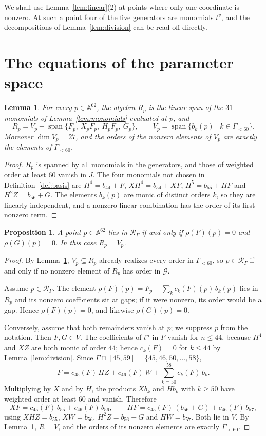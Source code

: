 \documentclass{amsart}
\newtheorem{proposition}[theorem]{Proposition}
\newtheorem{lemma}[theorem]{Lemma}
\theoremstyle{definition}
\theoremstyle{remark}
\numberwithin{equation}{section}
\newcommand{\AF}{\mathbb{A}}
\newcommand{\Rs}{\mathcal{R}_\Gamma}
\DeclareMathOperator{\spn}{span}
\begin{document}
We shall use Lemma~\ref{lem:linear}(2) at points where only one coordinate is nonzero. At such a point four of the five generators are monomials $t^{v}$, and the decompositions of Lemma~\ref{lem:division} can be read off directly.

\section{The equations of the parameter space}\label{sec:equations}

\begin{lemma}\label{lem:span}
For every $p\in\AF^{62}$, the algebra $R_p$ is the linear span of the $31$ monomials of Lemma~\ref{lem:monomials} evaluated at $p$, and
\[
R_p=V_p+\spn\{F_p,\ X_pF_p,\ H_pF_p,\ G_p\},\qquad V_p=\spn\{b_k(p)\mid k\in\Gamma_{<60}\}.
\]
Moreover $\dim V_p=27$, and the orders of the nonzero elements of $V_p$ are exactly the elements of $\Gamma_{<60}$.
\end{lemma}

\begin{proof}
$R_p$ is spanned by all monomials in the generators, and those of weighted order at least $60$ vanish in $J$. The four monomials not chosen in Definition~\ref{def:basis} are $H^4=b_{44}+F$, $XH^4=b_{54}+XF$, $H^5=b_{55}+HF$ and $H^2Z=b_{56}+G$. The elements $b_k(p)$ are monic of distinct orders $k$, so they are linearly independent, and a nonzero linear combination has the order of its first nonzero term.
\end{proof}

\begin{proposition}\label{prop:criterion}
A point $p\in\AF^{62}$ lies in $\Rs$ if and only if $\rho(F)(p)=0$ and $\rho(G)(p)=0$. In this case $R_p=V_p$.
\end{proposition}

\begin{proof}
By Lemma~\ref{lem:span}, $V_p\subseteq R_p$ already realizes every order in $\Gamma_{<60}$, so $p\in\Rs$ if and only if no nonzero element of $R_p$ has order in $\mathcal G$.

Assume $p\in\Rs$. The element $\rho(F)(p)=F_p-\sum_kc_k(F)(p)\,b_k(p)$ lies in $R_p$ and its nonzero coefficients sit at gaps; if it were nonzero, its order would be a gap. Hence $\rho(F)(p)=0$, and likewise $\rho(G)(p)=0$.

Conversely, assume that both remainders vanish at $p$; we suppress $p$ from the notation. Then $F,G\in V$. The coefficients of $t^n$ in $F$ vanish for $n\le44$, because $H^4$ and $XZ$ are both monic of order $44$; hence $c_k(F)=0$ for $k\le44$ by Lemma~\ref{lem:division}. Since $\Gamma\cap[45,59]=\{45,46,50,\dots,58\}$,
\[
F=c_{45}(F)\,HZ+c_{46}(F)\,W+\sum_{k=50}^{58}c_k(F)\,b_k .
\]
Multiplying by $X$ and by $H$, the products $Xb_k$ and $Hb_k$ with $k\ge50$ have weighted order at least $60$ and vanish. Therefore
\[
XF=c_{45}(F)\,b_{55}+c_{46}(F)\,b_{56},\qquad HF=c_{45}(F)\,(b_{56}+G)+c_{46}(F)\,b_{57},
\]
using $XHZ=b_{55}$, $XW=b_{56}$, $H^2Z=b_{56}+G$ and $HW=b_{57}$. Both lie in $V$. By Lemma~\ref{lem:span}, $R=V$, and the orders of its nonzero elements are exactly $\Gamma_{<60}$.
\end{proof}
\end{document}

